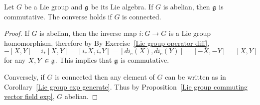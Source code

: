 \begin{corollary}\label{Lie group abelian algebra}
Let $G$ be a Lie group and $\mathfrak{g}$ be its Lie algebra. If $G$ is abelian, then $\mathfrak{g}$ is commutative. The converse holds if $G$ is connected.
\end{corollary}
\begin{proof}
If $G$ is abelian, then the inverse map $i:G\to G$ is a Lie group homomorphism, therefore by By Exercise~\ref{Lie group operator diff},
\[-[X,Y]=i_*[X,Y]=[i_*X,i_*Y]=[di_e(X),di_e(Y)]=[-X,-Y]=[X,Y]\]
for any $X,Y\in\mathfrak{g}$. This implies that $\mathfrak{g}$ is commutative.\par
Conversely, if $G$ is connected then any element of $G$ can be written as in Corollary~\ref{Lie group exp generate}. Thus by Proposition~\ref{Lie group commuting vector field exp}, $G$ abelian.
\end{proof}
